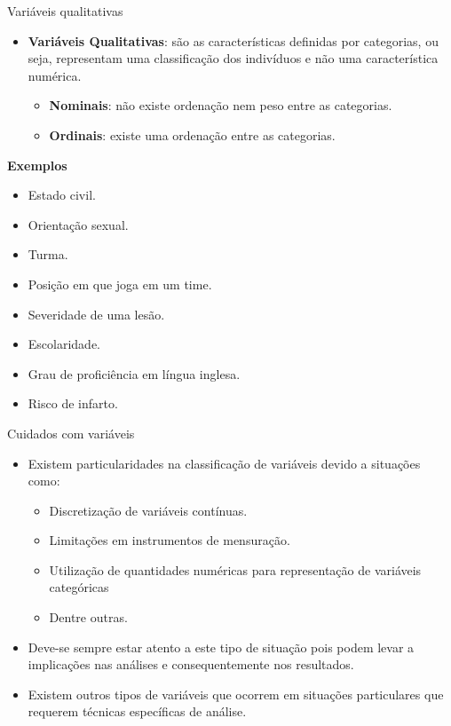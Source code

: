 \documentclass[
  ignorenonframetext,
  serif,
  professionalfont,
  usenames,
  dvipsnames,
  aspectratio = 169]{beamer}
\providecommand{\tightlist}{%
  \setlength{\itemsep}{0pt}\setlength{\parskip}{0pt}}
\renewcommand{\tightlist}{%
  \setlength{\itemsep}{0\baselineskip}
  \setlength{\parskip}{0.25\baselineskip}
}
\def\beginAHalfColumn{\begin{minipage}{0.49\textwidth}}%
\def\endColumns{\end{minipage}}%
\begin{document}
\begin{frame}{Variáveis qualitativas}
\protect\hypertarget{variuxe1veis-qualitativas}{}
\beginAHalfColumn

\begin{itemize}
\tightlist
\item
  \textbf{Variáveis Qualitativas}: são as características definidas por
  categorias, ou seja, representam uma classificação dos indivíduos e
  não uma característica numérica.

  \begin{itemize}
  \tightlist
  \item
    \textbf{Nominais}: não existe ordenação nem peso entre as
    categorias.
  \item
    \textbf{Ordinais}: existe uma ordenação entre as categorias.
  \end{itemize}
\end{itemize}

\endColumns
\beginAHalfColumn

\textbf{Exemplos}

\begin{itemize}
\tightlist
\item
  Estado civil.
\item
  Orientação sexual.
\item
  Turma.
\item
  Posição em que joga em um time.
\item
  Severidade de uma lesão.
\item
  Escolaridade.
\item
  Grau de proficiência em língua inglesa.
\item
  Risco de infarto.
\end{itemize}

\endColumns
\end{frame}

\begin{frame}{Cuidados com variáveis}
\protect\hypertarget{cuidados-com-variuxe1veis}{}
\begin{itemize}
\item
  Existem particularidades na classificação de variáveis devido a
  situações como:

  \begin{itemize}
  \tightlist
  \item
    Discretização de variáveis contínuas.
  \item
    Limitações em instrumentos de mensuração.
  \item
    Utilização de quantidades numéricas para representação de variáveis
    categóricas
  \item
    Dentre outras.
  \end{itemize}
\item
  Deve-se sempre estar atento a este tipo de situação pois podem levar a
  implicações nas análises e consequentemente nos resultados.
\item
  Existem outros tipos de variáveis que ocorrem em situações
  particulares que requerem técnicas específicas de análise.
\end{itemize}
\end{frame}
\end{document}
